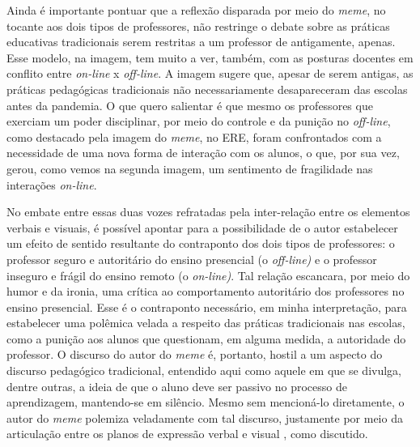 \documentclass[portuguese]{textolivre}
\begin{document}
Ainda é importante pontuar que a reflexão disparada por meio do \textit{meme}, no tocante aos dois tipos de professores, não restringe o debate sobre as práticas educativas tradicionais serem restritas a um professor de antigamente, apenas. Esse modelo, na imagem, tem muito a ver, também, com as posturas docentes em conflito entre \textit{on-line} x \textit{off-line}. A imagem sugere que, apesar de serem antigas, as práticas pedagógicas tradicionais não necessariamente desapareceram das escolas antes da pandemia. O que quero salientar é que mesmo os professores que exerciam um poder disciplinar, por meio do controle e da punição no \textit{off-line}, como destacado pela imagem do \textit{meme}, no ERE, foram confrontados com a necessidade de uma nova forma de interação com os alunos, o que, por sua vez, gerou, como vemos na segunda imagem, um sentimento de fragilidade nas interações \textit{on-line}.
	
No embate entre essas duas vozes refratadas pela inter-relação entre os elementos verbais e visuais, é possível apontar para a possibilidade de o autor estabelecer um efeito de sentido resultante do contraponto dos dois tipos de professores: o professor seguro e autoritário do ensino presencial (o \textit{off-line)} e o professor inseguro e frágil do ensino remoto (o \textit{on-line)}. Tal relação escancara, por meio do humor e da ironia, uma crítica ao comportamento autoritário dos professores no ensino presencial. Esse é o contraponto necessário, em minha interpretação, para estabelecer uma polêmica velada a respeito das práticas tradicionais nas escolas, como a punição aos alunos que questionam, em alguma medida, a autoridade do professor. O discurso do autor do \textit{meme} é, portanto, hostil a um aspecto do discurso pedagógico tradicional, entendido aqui como aquele em que se divulga, dentre outras, a ideia de que o aluno deve ser passivo no processo de aprendizagem, mantendo-se em silêncio. Mesmo sem mencioná-lo diretamente, o autor do \textit{meme} polemiza veladamente com tal discurso, justamente por meio da articulação entre os planos de expressão verbal e visual \cite{brait2013olhar}, como discutido.
 
\end{document}

